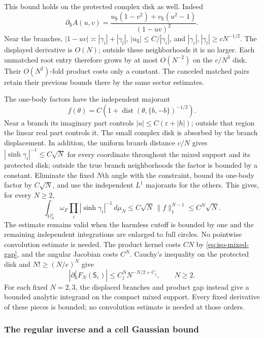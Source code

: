 \documentclass[11pt]{article}
\numberwithin{equation}{section}
\theoremstyle{definition}
\newcommand{\eps}{\varepsilon}
\begin{document}
This bound holds on the protected complex disk as well.  Indeed
\[
 \partial_{\mathsf S}A(u,v)
 =\frac{u_{\mathsf S}(1-v^2)+v_{\mathsf S}(u^2-1)}{(1-uv)^2}.
\]
Near the branches, $|1-uv|\asymp|\gamma_i|+|\gamma_l|$,
$|u_{\mathsf S}|\le C/|\gamma_i|$, and
$|\gamma_i|,|\gamma_l|\ge cN^{-1/2}$.  The displayed derivative
is $O(N)$; outside these neighborhoods it is no larger.
Each unmatched root entry therefore grows by at most $O(N^{-2})$
on the $c/N^3$ disk.  Their $O(N^2)$-fold product costs only a
constant.  The canceled matched pairs retain their previous bounds
there by the same sector estimates.

The one-body factors have the independent majorant
\[
 f(\theta)=C\left(1+
       \operatorname{dist}(\theta,\{b,-b\})^{-1/2}\right).
\]
Near a branch its imaginary part controls $|u|\le C(\eps+|h|)$;
outside that region the linear real part controls it.  The small
complex disk is absorbed by the branch displacement.  In addition,
the uniform branch distance $c/N$ gives
$|\sinh\gamma_i|^{-1}\le C\sqrt N$ for every coordinate throughout
the mixed support and its protected disk; outside the true branch
neighborhoods the factor is bounded by a constant.  Eliminate the
fixed $N$th angle with the constraint, bound its one-body factor by
$C\sqrt N$, and use the independent $L^1$ majorants for the others.
This gives, for every $N\ge2$,
\[
 \int_{\mathbb H_N^\sigma}\omega_F
       \prod_i|\sinh\gamma_i|^{-1}\,d\mu_N
       \le C\sqrt N\,\|f\|_1^{N-1}\le C^N\sqrt N .
\]
The estimate remains valid when the harmless cutoff is bounded by one
and the remaining independent integrations are enlarged to full circles.
No pointwise convolution estimate is needed.  The product kernel costs
$CN$ by \eqref{eq:iso-mixed-gap}, and the angular Jacobian costs
$C^N$.  Cauchy's inequality on the protected disk and $N!\ge(N/e)^N$
give
\begin{equation}\label{eq:iso-mixed-jets}
 |\partial_{\mathsf S}^j F_N(\mathsf S_\eps)|
       \le C_j^N N^{-N/2+C_j},\qquad N\ge2.
\end{equation}
For each fixed $N=2,3$, the displaced branches and product gap instead
give a bounded analytic integrand on the compact mixed support.
Every fixed derivative of these pieces is bounded; no convolution
estimate is needed at those orders.

\subsubsection{The regular inverse and a cell Gaussian bound}
\end{document}
